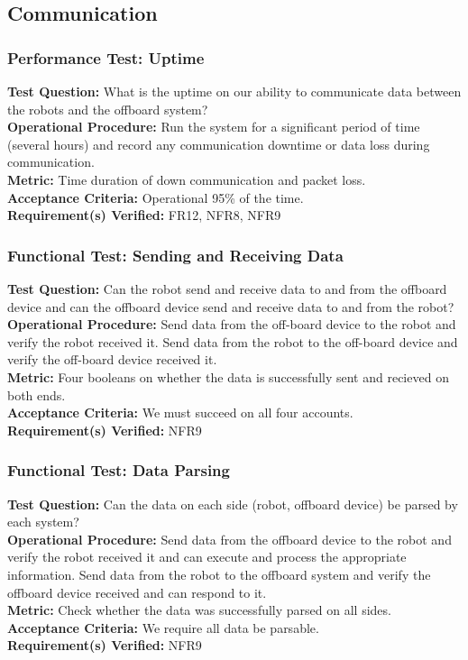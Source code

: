 
\subsection{Communication}
\label{sec:verification_comm}

\subsubsection{Performance Test: Uptime}
\label{test:comm_pt_reliability}
\textbf{Test Question:} What is the uptime on our ability to communicate data between the robots and the offboard system?  \\
\textbf{Operational Procedure:} Run the system for a significant period of time (several hours) and record any communication downtime or data loss during communication. \\
\textbf{Metric:} Time duration of down communication and packet loss. \\
\textbf{Acceptance Criteria:} Operational 95\% of the time.\\
\textbf{Requirement(s) Verified:} FR12, NFR8, NFR9

\subsubsection{Functional Test: Sending and Receiving Data}
\label{test:comm_ft_send}
\textbf{Test Question:} Can the robot send and receive data to and from the offboard device and can the offboard device send and receive data to and from the robot?\\
\textbf{Operational Procedure:} Send data from the off-board device to the robot and verify the robot received it. Send data from the robot to the off-board device and verify the off-board device received it. \\
\textbf{Metric:} Four booleans on whether the data is successfully sent and recieved on both ends. \\
\textbf{Acceptance Criteria:} We must succeed on all four accounts. \\
\textbf{Requirement(s) Verified:} NFR9

\subsubsection{Functional Test: Data Parsing}
\label{test:comm_ft_parse}
\textbf{Test Question:}  Can the data on each side (robot, offboard device) be parsed by each system? \\
\textbf{Operational Procedure:} Send data from the offboard device to the robot and verify the robot received it and can execute and process the appropriate information. Send data from the robot to the offboard system and verify the offboard device received and can respond to it. \\
\textbf{Metric:} Check whether the data was successfully parsed on all sides. \\
\textbf{Acceptance Criteria:} We require all data be parsable. \\
\textbf{Requirement(s) Verified:} NFR9 \\

